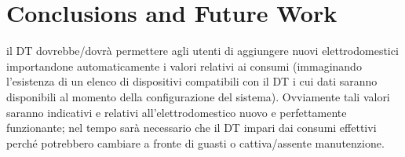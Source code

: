 \chapter{Conclusions and Future Work}\label{ch:conclusions}

il DT dovrebbe/dovrà permettere agli utenti di aggiungere nuovi elettrodomestici importandone automaticamente i valori relativi ai consumi (immaginando l'esistenza di un elenco di dispositivi compatibili con il DT i cui dati saranno disponibili al momento della configurazione del sistema). Ovviamente tali valori saranno indicativi e relativi all'elettrodomestico nuovo e perfettamente funzionante; nel tempo sarà necessario che il DT impari dai consumi effettivi perché potrebbero cambiare a fronte di guasti o cattiva/assente manutenzione.